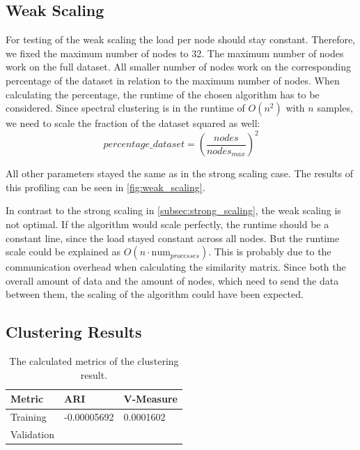 \subsection{Weak Scaling}
\label{subsec:weak_scaling}

For testing of the weak scaling the load per node should stay constant. Therefore, we fixed the
maximum number of nodes to 32.
The maximum number of nodes work on the full dataset. All smaller number of nodes work on the corresponding
percentage of the dataset in relation to the maximum number of nodes. When calculating the percentage, the runtime
of the chosen algorithm has to be considered. Since spectral clustering is in the runtime of \(O(n^2)\) with \(n\) samples,
we need to scale the fraction of the dataset squared as well:
\[percentage\_dataset = \left(\frac{nodes}{nodes_{max}}\right)^2\]

All other parameters stayed the same as in the strong scaling case.
The results of this profiling can be seen in \cref{fig:weak_scaling}.

In contrast to the strong scaling in \cref{subsec:strong_scaling}, the weak scaling is not optimal. If the algorithm would scale perfectly, the runtime should be a
constant line, since the load stayed constant across all nodes. But the runtime scale could be explained as \(O(n \cdot \text{num}_{processes})\).
This is probably due to the communication overhead when calculating the similarity matrix.
Since both the overall amount of data and the amount of nodes, which need to send the data between them, the scaling of the algorithm could have been expected.

\subsection{Clustering Results}
\label{subsec:clustering_results}

\begin{table}
    \centering
    \begin{tabular}{lll}
      \toprule
      Metric     &  ARI & V-Measure \\
      \midrule
      Training   &  -0.00005692  &  0.0001602     \\
      Validation &   & \\
      \bottomrule
    \end{tabular}
    \caption{The calculated metrics of the clustering result.}
    \label{tab:clustering_results}
  \end{table}

